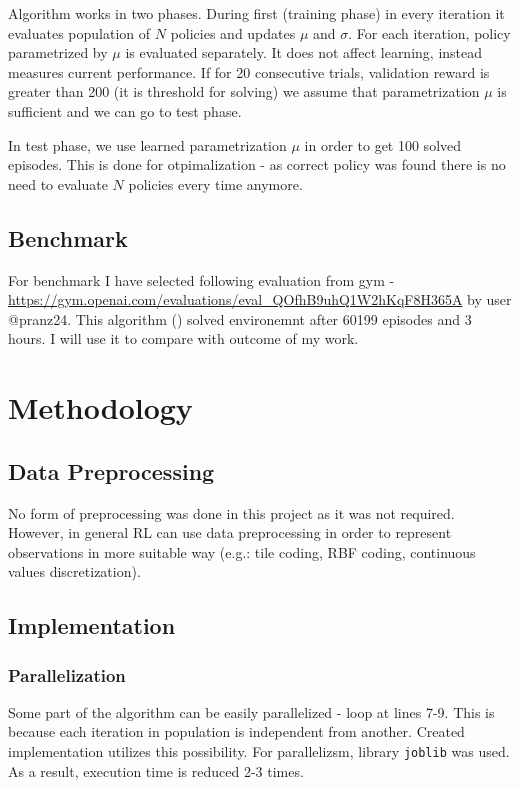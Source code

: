 \documentclass[12pt]{article}
\begin{document}
Algorithm works in two phases. During first (training phase) in every iteration it evaluates population of $N$ policies and updates $\mu$ and $\sigma$. For each iteration, policy parametrized by $\mu$ is evaluated separately. It does not affect learning, instead measures current performance. If for 20 consecutive trials, validation reward is greater than 200 (it is threshold for solving) we assume that parametrization $\mu$ is sufficient and we can go to test phase.

In test phase, we use learned parametrization $\mu$ in order to get 100 solved episodes. This is done for otpimalization - as correct policy was found there is no need to evaluate $N$ policies every time anymore.


\subsection{Benchmark}

For benchmark I have selected following evaluation from gym - \url{https://gym.openai.com/evaluations/eval_QOfhB9uhQ1W2hKqF8H365A} by user @pranz24. This algorithm () solved environemnt after 60199 episodes and 3 hours. I will use it to compare with outcome of my work.

\section{Methodology}
\subsection{Data Preprocessing}

No form of preprocessing was done in this project as it was not required. However, in general RL can use data preprocessing in order to represent observations in more suitable way (e.g.: tile coding, RBF coding, continuous values discretization).

\subsection{Implementation}

\subsubsection{Parallelization}

Some part of the algorithm can be easily parallelized - loop at lines 7-9. This is because each iteration in population is independent from another. Created implementation utilizes this possibility. For parallelizsm, library \texttt{joblib}\cite{joblib} was used. As a result, execution time is reduced 2-3 times.
\end{document}
